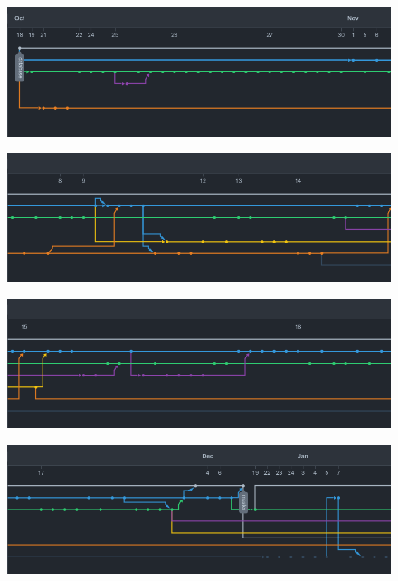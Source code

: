 		
			\begin{figure}[H]\centering
				\includegraphics[width=1\textwidth]{slike/image.png}
				\caption{}
			\end{figure}
			
			\begin{figure}[H]\centering
				\includegraphics[width=1\textwidth]{slike/image2.png}
				\caption{}
			\end{figure}
			 
			\begin{figure}[H]\centering
				\includegraphics[width=1\textwidth]{slike/image3.png}
				\caption{}
			\end{figure}
		
			\begin{figure}[H]\centering
				\includegraphics[width=1\textwidth]{slike/image4.png}
				\caption{}
			\end{figure}
			
